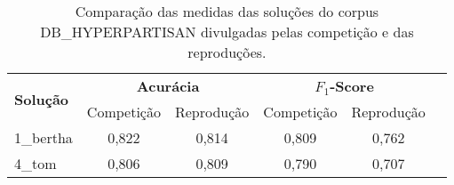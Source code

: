 \begin{table}[!thb]
    \centering
    \caption{Comparação das medidas das soluções do corpus DB\_HYPERPARTISAN divulgadas pelas competição e das reproduções.}
    \begin{adjustbox}{max width={\textwidth},keepaspectratio}%
    \begin{tabular}{|l|c|c|c|c|c|}
        \hline
        \multirow{2}{*}{\textbf{Solução}}
        & \multicolumn{2}{|c|}{\textbf{Acurácia}}
        & \multicolumn{2}{|c|}{\textbf{$F_1$-Score}}
        \\ \cline{2-5}    
        & Competição    & Reprodução
        & Competição    & Reprodução 
        \\ \hline
        1\_bertha        
        & 0,822         & 0,814
        & 0,809         & 0,762
        \\ \hline
        4\_tom
        & 0,806         & 0,809
        & 0,790         & 0,707              
        \\ 
        \hline
    \end{tabular}
    \end{adjustbox}
    \label{tab:reprodução-db-hyperpartisan} 
\end{table}
